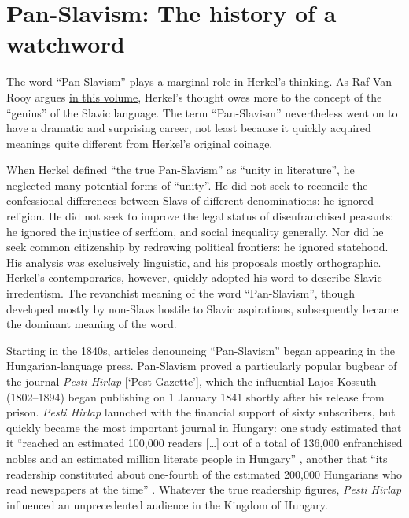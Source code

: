 \section{Pan-Slavism: The history of a watchword}

The word “Pan-Slavism” plays a marginal role in Herkel’s thinking. As Raf Van Rooy argues \hyperref[ch:Van_Rooy]{in this volume}, Herkel’s thought owes more to the concept of the “genius” of the Slavic language. The term “Pan-Slavism” nevertheless went on to have a dramatic and surprising career, not least because it quickly acquired meanings quite different from Herkel’s original coinage.

When Herkel defined “the true Pan-Slavism” as “unity in literature”, he neglected many potential forms of “unity”. He did not seek to reconcile the confessional differences between Slavs of different denominations: he ignored religion. He did not seek to improve the legal status of disenfranchised peasants: he ignored the injustice of serfdom, and social inequality generally. Nor did he seek common citizenship by redrawing political frontiers: he ignored statehood. His analysis was exclusively linguistic, and his proposals mostly orthographic. Herkel’s contemporaries, however, quickly adopted his word to describe Slavic irredentism. The revanchist meaning of the word “Pan-Slavism”, though developed mostly by non-Slavs hostile to Slavic aspirations, subsequently became the dominant meaning of the word.

Starting in the 1840s, articles denouncing “Pan-Slavism” began appearing in the Hungarian-language press. Pan-Slavism proved a particularly popular bugbear of the journal \textit{Pesti Hirlap} [‘Pest Gazette’], which the influential Lajos Kossuth (1802--1894) began publishing on 1 January 1841 shortly after his release from prison. \textit{Pesti Hirlap} launched with the financial support of sixty subscribers, but quickly became the most important journal in Hungary: one study estimated that it “reached an estimated 100,000 readers […] out of a total of 136,000 enfranchised nobles and an estimated million literate people in Hungary” \citep[146]{judson_habsburg_2016}, another that “its readership constituted about one-fourth of the estimated 200,000 Hungarians who read newspapers at the time” \citep[199]{sugar_history_1990}. Whatever the true readership figures, \textit{Pesti Hirlap} influenced an unprecedented audience in the Kingdom of Hungary.

